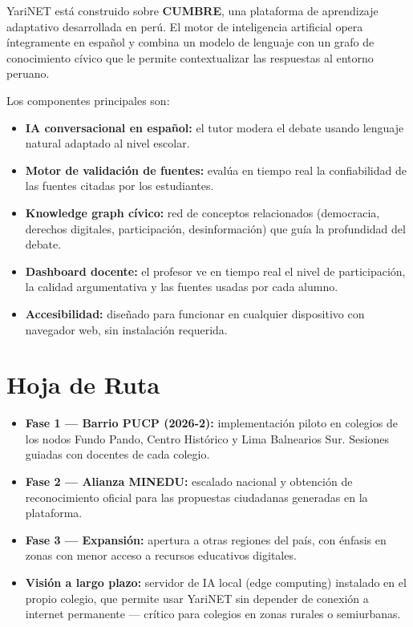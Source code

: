 \documentclass[a4paper, 11pt]{article}
\begin{document}
YariNET est\'{a} construido sobre \textbf{CUMBRE}, una plataforma de aprendizaje
adaptativo desarrollada en per\'{u}. El motor de inteligencia artificial opera
\'{i}ntegramente en espa\~{n}ol y combina un modelo de lenguaje con un grafo
de conocimiento c\'{i}vico que le permite contextualizar las respuestas al
entorno peruano.

Los componentes principales son:

\begin{itemize}[leftmargin=18pt, itemsep=4pt]
  \item \textbf{IA conversacional en espa\~{n}ol:} el tutor modera el debate
        usando lenguaje natural adaptado al nivel escolar.
  \item \textbf{Motor de validaci\'{o}n de fuentes:} eval\'{u}a en tiempo real
        la confiabilidad de las fuentes citadas por los estudiantes.
  \item \textbf{Knowledge graph c\'{i}vico:} red de conceptos relacionados
        (democracia, derechos digitales, participaci\'{o}n, desinformaci\'{o}n)
        que guía la profundidad del debate.
  \item \textbf{Dashboard docente:} el profesor ve en tiempo real el nivel
        de participaci\'{o}n, la calidad argumentativa y las fuentes usadas
        por cada alumno.
  \item \textbf{Accesibilidad:} dise\~{n}ado para funcionar en cualquier
        dispositivo con navegador web, sin instalaci\'{o}n requerida.
\end{itemize}

\section{Hoja de Ruta}

\begin{itemize}[leftmargin=18pt, itemsep=5pt]
  \item \textbf{Fase 1 --- Barrio PUCP (2026-2):} implementaci\'{o}n piloto
        en colegios de los nodos Fundo Pando, Centro Hist\'{o}rico y Lima
        Balnearios Sur. Sesiones guiadas con docentes de cada colegio.
  \item \textbf{Fase 2 --- Alianza MINEDU:} escalado nacional y obtenci\'{o}n
        de reconocimiento oficial para las propuestas ciudadanas generadas
        en la plataforma.
  \item \textbf{Fase 3 --- Expansi\'{o}n:} apertura a otras regiones del
        pa\'{i}s, con \'{e}nfasis en zonas con menor acceso a recursos
        educativos digitales.
  \item \textbf{Visi\'{o}n a largo plazo:} servidor de IA local (edge computing)
        instalado en el propio colegio, que permite usar YariNET sin depender
        de conexi\'{o}n a internet permanente --- cr\'{i}tico para colegios
        en zonas rurales o semiurbanas.
\end{itemize}
\end{document}
